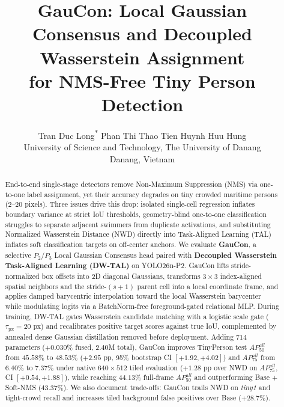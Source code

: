 \documentclass[10pt,twocolumn,letterpaper]{article}
\begin{document}
\title{GauCon: Local Gaussian Consensus and Decoupled Wasserstein Assignment\\for NMS-Free Tiny Person Detection}

\author{
  Tran Duc Long\textsuperscript{*} \quad
  Phan Thi Thao Tien \quad
  Huynh Huu Hung\textsuperscript{\dag} \\
  University of Science and Technology, The University of Danang \\
  Danang, Vietnam
}

\maketitle
{\renewcommand\thefootnote{}}

\begin{abstract}
End-to-end single-stage detectors remove Non-Maximum Suppression (NMS) via one-to-one label assignment, yet their accuracy degrades on tiny crowded maritime persons ($2\text{--}20$ pixels). Three issues drive this drop: isolated single-cell regression inflates boundary variance at strict IoU thresholds, geometry-blind one-to-one classification struggles to separate adjacent swimmers from duplicate activations, and substituting Normalized Wasserstein Distance (NWD) directly into Task-Aligned Learning (TAL) inflates soft classification targets on off-center anchors. We evaluate \textbf{GauCon}, a selective $P_2/P_3$ Local Gaussian Consensus head paired with \textbf{Decoupled Wasserstein Task-Aligned Learning (DW-TAL)} on YOLO26n-P2. GauCon lifts stride-normalized box offsets into 2D diagonal Gaussians, transforms $3\times 3$ index-aligned spatial neighbors and the stride-$(s{+}1)$ parent cell into a local coordinate frame, and applies damped barycentric interpolation toward the local Wasserstein barycenter while modulating logits via a BatchNorm-free foreground-gated relational MLP. During training, DW-TAL gates Wasserstein candidate matching with a logistic scale gate ($\tau_{\mathrm{px}}=20$ px) and recalibrates positive target scores against true IoU, complemented by annealed dense Gaussian distillation removed before deployment. Adding $714$ parameters ($+0.030\%$ fused, $2.40$M total), GauCon improves TinyPerson test $AP_{50}^{all}$ from $45.58\%$ to $48.53\%$ ($+2.95$ pp, 95\% bootstrap CI $[+1.92, +4.02]$) and $AP_{75}^{all}$ from $6.40\%$ to $7.37\%$ under native $640\times 512$ tiled evaluation ($+1.28$ pp over NWD on $AP_{75}^{all}$, CI $[+0.54, +1.88]$), while reaching $44.13\%$ full-frame $AP_{50}^{all}$ and outperforming Base + Soft-NMS ($43.37\%$). We also document trade-offs: GauCon trails NWD on \textit{tiny1} and tight-crowd recall and increases tiled background false positives over Base ($+28.7\%$).
\end{abstract}
\end{document}

